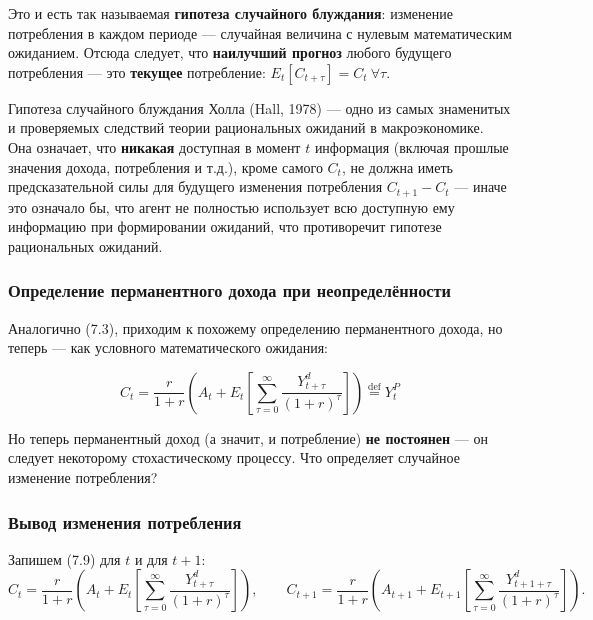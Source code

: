\documentclass[10pt,a4paper]{article}
\begin{document}
Это и есть так называемая \textbf{гипотеза случайного блуждания}: изменение потребления в каждом периоде — случайная величина с нулевым математическим ожиданием. Отсюда следует, что \textbf{наилучший прогноз} любого будущего потребления — это \textbf{текущее} потребление: $E_t[C_{t+\tau}] = C_t\ \forall\tau$.

\begin{intuition}
Гипотеза случайного блуждания Холла (Hall, 1978) — одно из самых знаменитых и проверяемых следствий теории рациональных ожиданий в макроэкономике. Она означает, что \textbf{никакая} доступная в момент $t$ информация (включая прошлые значения дохода, потребления и т.д.), кроме самого $C_t$, не должна иметь предсказательной силы для будущего изменения потребления $C_{t+1}-C_t$ — иначе это означало бы, что агент не полностью использует всю доступную ему информацию при формировании ожиданий, что противоречит гипотезе рациональных ожиданий.
\end{intuition}

\subsubsection{Определение перманентного дохода при неопределённости}

Аналогично (7.3), приходим к похожему определению перманентного дохода, но теперь — как условного математического ожидания:
\begin{formulabox}
\begin{equation}
C_t = \frac{r}{1+r}\left(A_t + E_t\left[\sum_{\tau=0}^{\infty}\frac{Y_{t+\tau}^{d}}{(1+r)^\tau}\right]\right) \overset{\text{def}}{=} Y_t^{P} \tag{7.9}
\end{equation}
\end{formulabox}

Но теперь перманентный доход (а значит, и потребление) \textbf{не постоянен} — он следует некоторому стохастическому процессу. Что определяет случайное изменение потребления?

\subsubsection{Вывод изменения потребления}

Запишем (7.9) для $t$ и для $t+1$:
$$C_t = \frac{r}{1+r}\left(A_t + E_t\left[\sum_{\tau=0}^{\infty}\frac{Y_{t+\tau}^{d}}{(1+r)^\tau}\right]\right), \qquad C_{t+1} = \frac{r}{1+r}\left(A_{t+1} + E_{t+1}\left[\sum_{\tau=0}^{\infty}\frac{Y_{t+1+\tau}^{d}}{(1+r)^\tau}\right]\right).$$
\end{document}
